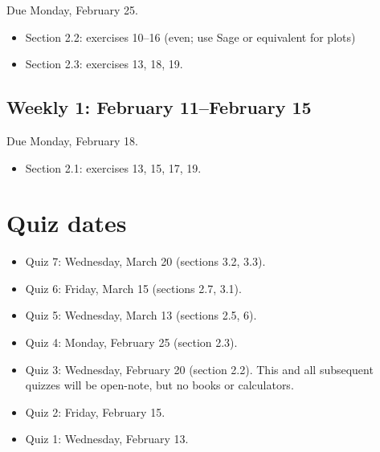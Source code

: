 Due Monday, February 25.

\begin{itemize}
\item Section 2.2: exercises 10--16 (even; use Sage or equivalent for plots)

\item Section 2.3: exercises 13, 18, 19.

\end{itemize}

\subsection{Weekly 1: February 11--February 15}
\label{weekly1:february11--february15}

Due Monday, February 18.

\begin{itemize}
\item Section 2.1: exercises 13, 15, 17, 19.

\end{itemize}

\section{Quiz dates}
\label{quizzes}

\begin{itemize}
\item Quiz 7: Wednesday, March 20 (sections 3.2, 3.3).

\item Quiz 6: Friday, March 15 (sections 2.7, 3.1).

\item Quiz 5: Wednesday, March 13 (sections 2.5, 6).

\item Quiz 4: Monday, February 25 (section 2.3).

\item Quiz 3: Wednesday, February 20 (section 2.2). This and all subsequent quizzes will be open-note, but no books or calculators.

\item Quiz 2: Friday, February 15.

\item Quiz 1: Wednesday, February 13.

\end{itemize}




